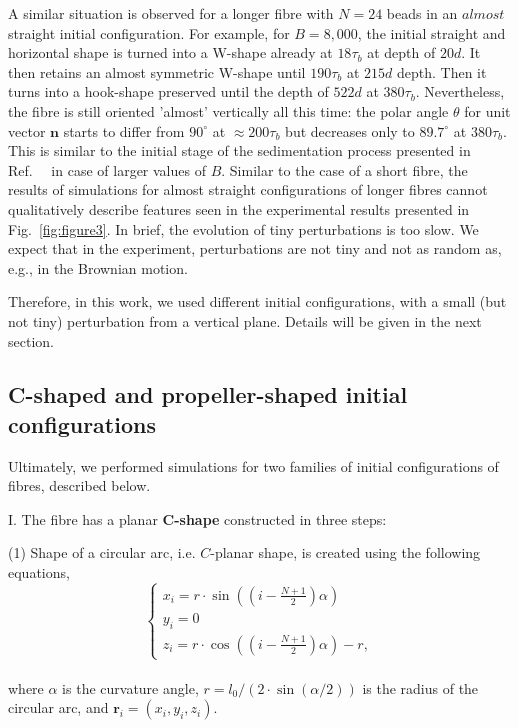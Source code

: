 \documentclass{article}
\begin{document}
A similar situation is observed for a longer fibre with $N=24$ beads in an $almost$ straight initial configuration. 
For example, for %
$B=8,000$, the initial straight and horizontal shape is turned into a W-shape %
already at $18 \tau_{b}$ at depth of $20d$. 
It then retains an almost symmetric W-shape until $190 \tau_{b}$ at $215d$ depth. 
Then it turns into a hook-shape preserved until the depth of $522d$ at $380 \tau_{b}$.
Nevertheless, the fibre is still oriented 'almost' vertically all this time: the polar angle $\theta$ for unit vector $\mathbf{n}$ starts to differ from $90^{\circ}$ at $\approx 200 \tau_{b}$ but decreases only to $89.7^{\circ}$ at $380 \tau_{b}$. 
This is similar to the initial stage of the sedimentation process presented in Ref.~~\cite{saggiorato2015conformations} in case of larger values of $B$. %
Similar to the case of a short fibre, the results of simulations for almost straight configurations of longer fibres %
cannot qualitatively describe features seen in the experimental results presented in Fig.~\ref{fig:figure3}. In brief, the evolution of tiny perturbations is too slow. We expect that in the experiment, perturbations are not tiny and not as random as, e.g., in the Brownian motion.

Therefore, in this work, we used different initial configurations, with a small (but not tiny) perturbation from a vertical plane. Details will be given in the next section. %

\subsection{C-shaped and propeller-shaped initial configurations}\label{Cpropeller}

Ultimately, we performed simulations for two families of initial configurations of fibres, described below.

  I. The fibre has a planar {\bf C-shape} constructed in three steps:
  
  (1) Shape of a circular arc, i.e. $C$-planar shape, is created using the following equations,
  \begin{equation}
  \begin{cases}
    x_i = r \cdot \sin \left( \left( i - \frac{N+1}{2} \right) \alpha \right) \\
    y_i = 0 \\
    z_i = r \cdot \cos \left( \left( i - \frac{N+1}{2} \right) \alpha \right) - r,
  \end{cases}
  \label{eq:c-shape}
\end{equation}
\\
where $\alpha$ is the curvature angle, $r = l_0 / \left( 2 \cdot \sin \left( \alpha/2 \right) \right) $ is the radius of the circular arc, and $\bm{r}_i=(x_i,y_i,z_i)$.
\end{document}
